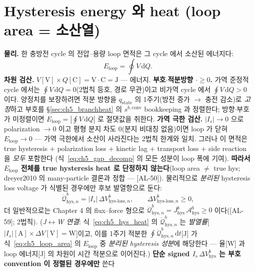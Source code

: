 \documentclass[11pt,a4paper]{article}
\newcommand{\dd}{\mathrm{d}}
\newcommand{\conv}{\mathrm{conv}}
\newcommand{\hys}{\mathrm{hys}}
\newcommand{\loss}{\mathrm{loss}}
\newcommand{\stt}{\mathrm{state}}
\newcommand{\AL}[1]{\textsf{[AL-#1]}}
\begin{document}
\section{Hysteresis energy 와 heat (loop area = 소산열)}\label{sec:ch5_hysheat}
\textbf{물리.} 한 충방전 cycle 의 전압--용량 loop 면적은 그 cycle 에서 소산된 에너지다:
\begin{equation}
E_{\mathrm{loop}}=\oint V\,\dd Q.
\label{eq:ch5_loop_area}
\end{equation}
\textbf{차원 검산.} $V[\mathrm V]\times Q[\mathrm C]=\mathrm{V\cdot C}=\mathrm J$ — 에너지. \textbf{부호$\cdot$적분방향
$\cdot$$\ge0$.} 가역 준정적 cycle 에서는 $\oint V\,\dd Q=0$(2법칙 등호, 경로 무관)이고 비가역 cycle 에서 $\oint
V\,\dd Q>0$ 이다. 양정치를 보장하려면 적분 방향을 $q_\stt$ 의 1주기(방전 증가 $\to$ 충전 감소)로 \emph{고정}하고
부호를 \S\ref{sec:ch5_branchheat} 의 $s^{b,\conv}$ bookkeeping 과 정렬한다; 방향$\cdot$부호가 미정렬이면
$E_{\mathrm{loop}}=|\oint V\,\dd Q|$ 로 절댓값을 취한다. \textbf{가역 극한 검산.} $|I_s|\to0$ 으로 polarization
$\to0$ 이고 평형 분지 차도 0(분지 비대칭 없음)이면 loop 가 닫혀 $E_{\mathrm{loop}}\to0$ — 가역 극한에서 소산이
사라진다는 2법칙 한계와 일치. 그러나 이 면적은
true hysteresis + polarization loss + kinetic lag + transport loss + side reaction 을 \emph{모두} 포함한다
(식~\eqref{eq:ch5_gap_decomp} 의 모든 성분이 loop 폭에 기여). \textbf{따라서 $E_{\mathrm{loop}}$ 전체를 true
hysteresis heat 로 단정하지 않는다}(loop area $\ne$ true hys; dreyer2010 의 many-particle 결론과 정합 —
\AL{50}). 물리적으로 \emph{분리된} hysteresis loss voltage 가 식별된 경우에만 후보 발열항으로 둔다:
\begin{equation}
\dot{\mathcal Q}_{\hys,n}^b=|I_s|\,\Delta V_{\hys\text{-}\loss,n}^b,\qquad \Delta V_{\hys\text{-}\loss,n}^b\ge0,
\label{eq:ch5_hys_heat}
\end{equation}
더 일반적으로는 Chapter 4 의 flux--force 형으로 $\dot{\mathcal Q}_{\hys,n}^b=J_\hys^b\,\mathcal A_\hys^b\ge0$
이다(\AL{59}; 2법칙). (\emph{J$\leftrightarrow$W 연결}: 식~\eqref{eq:ch5_hys_heat} 의 $\dot{\mathcal Q}_{\hys,n}^b$
는 \emph{발열률}[$|I_s|[\mathrm A]\times\Delta V[\mathrm V]=\mathrm W$]이고, 이를 1주기 적분한 $\oint\dot{\mathcal Q}_{\hys,n}^b\,\dd t$[J]
가 식~\eqref{eq:ch5_loop_area} 의 $E_{\mathrm{loop}}$ 중 \emph{분리된 hysteresis 성분}에 해당한다 — 율[W] 과
loop 에너지[J] 의 차원이 시간 적분으로 이어진다.) \textbf{단순 signed $I_s\,\Delta V_\hys^b$ 는 부호 convention 이 정렬된 경우에만} 쓴다
\end{document}
